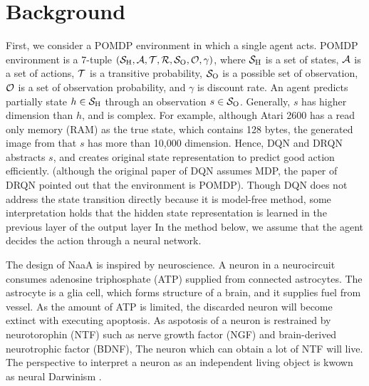 \section{Background}
First, we consider a POMDP environment in which a single agent acts.
POMDP environment is a 7-tuple $(\S, \A, \Trans, \R, \Observations, \ObProb, \gamma)$,
where $\S$ is a set of states, $\A$ is a set of actions, $\Trans$ is a transitive probability, 
$\Observations$ is a possible set of observation, $\ObProb$ is a set of observation probability, and
$\gamma$ is discount rate.
An agent predicts partially state $h \in \S$ through an observation $s \in \Observations$.
Generally, $s$ has higher dimension than $h$, and is complex.
For example, although Atari 2600 has a read only memory (RAM) as the true state, which contains 128 bytes,
the generated image from that $s$ has more than 10,000 dimension.
Hence, DQN and DRQN abstracts $s$, and creates original state representation to predict good action efficiently.
(although the original paper of DQN assumes MDP, the paper of DRQN pointed out that the environment is POMDP).
Though DQN does not address the state transition directly because it is model-free method, 
some interpretation holds that the hidden state representation is learned in the previous layer of the output layer \citep{zahavy2016graying}
In the method below, we assume that the agent decides the action through a neural network.


The design of NaaA is inspired by neuroscience.
A neuron in a neurocircuit consumes adenosine triphosphate (ATP) supplied from connected astrocytes.
The astrocyte is a glia cell, which forms structure of a brain, and it supplies fuel from vessel.
As the amount of ATP is limited, the discarded neuron will become extinct with executing apoptosis.
As aspotosis of a neuron is restrained by neurotorophin (NTF) such as nerve growth factor (NGF) and brain-derived neurotrophic factor (BDNF),
The neuron which can obtain a lot of NTF will live.
The perspective to interpret a neuron as an independent living object is kwown as neural Darwinism \citep{edelman1987neural}.
